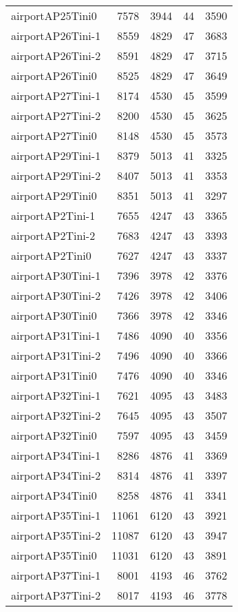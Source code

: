 \begin{longtable}{lrrrr}
airportAP25Tini0 & 7578 & 3944 & 44 & 3590 \\
airportAP26Tini-1 & 8559 & 4829 & 47 & 3683 \\
airportAP26Tini-2 & 8591 & 4829 & 47 & 3715 \\
airportAP26Tini0 & 8525 & 4829 & 47 & 3649 \\
airportAP27Tini-1 & 8174 & 4530 & 45 & 3599 \\
airportAP27Tini-2 & 8200 & 4530 & 45 & 3625 \\
airportAP27Tini0 & 8148 & 4530 & 45 & 3573 \\
airportAP29Tini-1 & 8379 & 5013 & 41 & 3325 \\
airportAP29Tini-2 & 8407 & 5013 & 41 & 3353 \\
airportAP29Tini0 & 8351 & 5013 & 41 & 3297 \\
airportAP2Tini-1 & 7655 & 4247 & 43 & 3365 \\
airportAP2Tini-2 & 7683 & 4247 & 43 & 3393 \\
airportAP2Tini0 & 7627 & 4247 & 43 & 3337 \\
airportAP30Tini-1 & 7396 & 3978 & 42 & 3376 \\
airportAP30Tini-2 & 7426 & 3978 & 42 & 3406 \\
airportAP30Tini0 & 7366 & 3978 & 42 & 3346 \\
airportAP31Tini-1 & 7486 & 4090 & 40 & 3356 \\
airportAP31Tini-2 & 7496 & 4090 & 40 & 3366 \\
airportAP31Tini0 & 7476 & 4090 & 40 & 3346 \\
airportAP32Tini-1 & 7621 & 4095 & 43 & 3483 \\
airportAP32Tini-2 & 7645 & 4095 & 43 & 3507 \\
airportAP32Tini0 & 7597 & 4095 & 43 & 3459 \\
airportAP34Tini-1 & 8286 & 4876 & 41 & 3369 \\
airportAP34Tini-2 & 8314 & 4876 & 41 & 3397 \\
airportAP34Tini0 & 8258 & 4876 & 41 & 3341 \\
airportAP35Tini-1 & 11061 & 6120 & 43 & 3921 \\
airportAP35Tini-2 & 11087 & 6120 & 43 & 3947 \\
airportAP35Tini0 & 11031 & 6120 & 43 & 3891 \\
airportAP37Tini-1 & 8001 & 4193 & 46 & 3762 \\
airportAP37Tini-2 & 8017 & 4193 & 46 & 3778 \\

\end{longtable}
